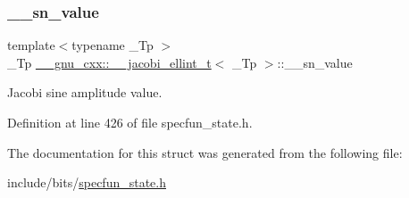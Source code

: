 \subsubsection{\texorpdfstring{\+\_\+\+\_\+sn\+\_\+value}{\_\_sn\_value}}
{\footnotesize\ttfamily template$<$typename \+\_\+\+Tp $>$ \\
\+\_\+\+Tp \hyperlink{struct____gnu__cxx_1_1____jacobi__ellint__t}{\+\_\+\+\_\+gnu\+\_\+cxx\+::\+\_\+\+\_\+jacobi\+\_\+ellint\+\_\+t}$<$ \+\_\+\+Tp $>$\+::\+\_\+\+\_\+sn\+\_\+value}



Jacobi sine amplitude value. 



Definition at line 426 of file specfun\+\_\+state.\+h.



The documentation for this struct was generated from the following file\+:\begin{DoxyCompactItemize}
\item 
include/bits/\hyperlink{specfun__state_8h}{specfun\+\_\+state.\+h}\end{DoxyCompactItemize}
